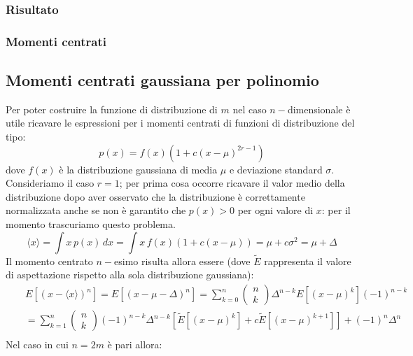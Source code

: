 \subsubsection{Risultato}
\subsubsection{Momenti centrati}
\subsection{Momenti centrati gaussiana per polinomio}
Per poter costruire la funzione di distribuzione di $m$ nel caso $n-$dimensionale
\`e utile ricavare le espressioni per i momenti centrati di funzioni di distribuzione del tipo:
\[p(x)=f(x)(1+c(x-\mu)^{2r-1})\]
dove $f(x)$ \`e la distribuzione gaussiana di media $\mu$ e deviazione standard
$\sigma$.\\
Consideriamo il caso $r=1$; per prima cosa occorre ricavare il valor medio della
distribuzione dopo aver osservato che la distribuzione \`e correttamente normalizzata
anche se non \`e garantito che $p(x)>0$ per ogni valore di $x$: per il momento trascuriamo questo problema.
\[\langle x\rangle=\int x\,p(x)\,dx=\int x\,f(x)(1+c(x-\mu))=\mu+c\sigma^2=\mu+\Delta\]
Il momento centrato $n-$esimo risulta allora essere (dove $\widetilde E$ rappresenta
il valore di aspettazione rispetto alla sola distribuzione gaussiana):
\begin{eqnarray*}
&&E\left[(x-\langle x\rangle)^n\right]=E\left[(x-\mu-\Delta)^n\right]=\sum_{k=0}^n\left(\begin{array}{c}n\\k\end{array}\right)\Delta^{n-k}E\left[(x-\mu)^k\right](-1)^{n-k}\\
&&=\sum_{k=1}^n\left(\begin{array}{c}n\\k\end{array}\right)(-1)^{n-k}\Delta^{n-k}\left[\widetilde E\left[(x-\mu)^k\right]+c\widetilde E\left[(x-\mu)^{k+1}\right]\right]+(-1)^n\Delta^n\\
\end{eqnarray*}
Nel caso in cui $n=2m$ \`e pari allora:
